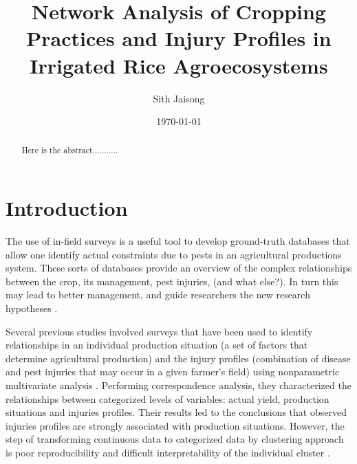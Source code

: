 \documentclass[a4paper]{article}
\title{Network Analysis of Cropping Practices and Injury Profiles in Irrigated Rice Agroecosystems}
\author{Sith Jaisong}
\date{\today}
\begin{document}
\maketitle

\begin{abstract}
Here is the abstract...........
\end{abstract}

\section*{Introduction}

The use of in-field surveys is a useful tool to develop ground-truth databases that allow one identify actual constraints due to pests in an agricultural productions system. These sorts of databases provide an overview of the complex relationships between the crop, its management, pest injuries, (and what else?).  In turn this may lead to better management, and guide researchers the new research hypotheses \citep{mew:2004kh, Savary:2006to}. 



Several previous studies \citep{Savary:2000char, savary2000quanti, savary2005multiple, dong2010characterization, Reddy:2011hl} involved surveys that have been used to identify relationships in an individual production situation (a set of factors that determine agricultural production) and the injury profiles (combination of disease and pest injuries that may occur in a given farmer's field) using nonparametric multivariate analysis \citep{savary1997new}. Performing correspondence analysis, they characterized the relationships between categorized levels of variables: actual yield, production situations  and injuries profiles. Their results led to the conclusions that observed injuries profiles are strongly associated with production situations\citep{mew:2004kh}. However, the step of transforming continuous data to categorized data by clustering approach is poor reproducibility and difficult interpretability of the individual cluster \citep{jiang2004cluster, avelino:2006ie}.   
\end{document}
